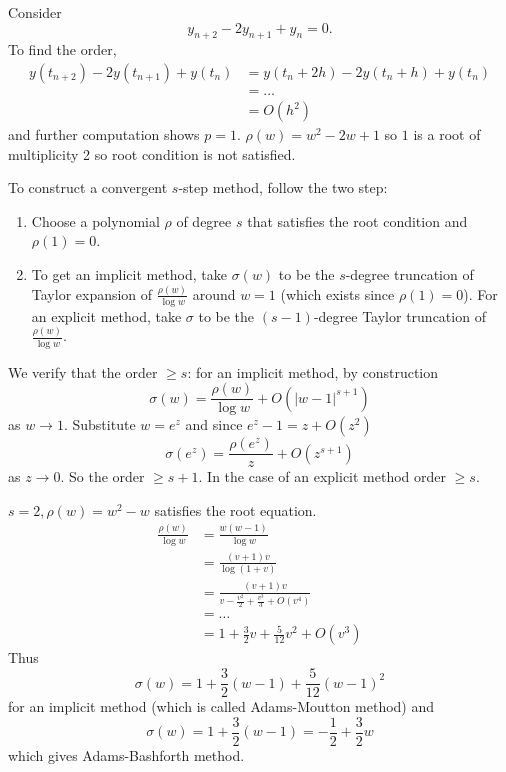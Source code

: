 \documentclass[a4paper]{article}
\begin{document}
\begin{eg}
  Consider
  \[
    y_{n + 2} - 2y_{n + 1} + y_n = 0.
  \]
  To find the order,
  \begin{align*}
    y(t_{n + 2}) - 2y(t_{n + 1}) + y(t_n)
    &= y(t_n + 2h) - 2y(t_n + h) + y(t_n) \\
    &= \dots \\
    &= O(h^2)
  \end{align*}
  and further computation shows \(p = 1\). \(\rho(w) = w^2 - 2w + 1\) so \(1\) is a root of multiplicity 2 so root condition is not satisfied.
\end{eg}

To construct a convergent \(s\)-step method, follow the two step:
\begin{enumerate}
\item Choose a polynomial \(\rho\) of degree \(s\) that satisfies the root condition and \(\rho(1) = 0\).
\item To get an implicit method, take \(\sigma(w)\) to be the \(s\)-degree truncation of Taylor expansion of \(\frac{\rho(w)}{\log w}\) around \(w = 1\) (which exists since \(\rho(1) = 0\)). For an explicit method, take \(\sigma\) to be the \((s - 1)\)-degree Taylor truncation of \(\frac{\rho(w)}{\log w}\).
\end{enumerate}

We verify that the order \(\geq s\): for an implicit method, by construction
\[
  \sigma(w) = \frac{\rho(w)}{\log w} + O(|w - 1|^{s + 1})
\]
as \(w \to 1\). Substitute \(w = e^z\) and since \(e^z - 1 = z + O(z^2)\)
\[
  \sigma(e^z) = \frac{\rho(e^z)}{z} + O(z^{s + 1})
\]
as \(z \to 0\). So the order \(\geq s + 1\). In the case of an explicit method order \(\geq s\).

\begin{eg}
  \(s = 2, \rho(w) = w^2 - w\) satisfies the root equation.
  \begin{align*}
    \frac{\rho(w)}{\log w}
    &= \frac{w(w - 1)}{\log w} \\
    &= \frac{(v + 1)v}{\log (1 + v)} \\
    &= \frac{(v + 1)v}{ v - \frac{v^2}{2} + \frac{v^3}{3} + O(v^4)} \\
    &= \dots \\
    &= 1 + \frac{3}{2}v + \frac{5}{12}v^2 + O(v^3)
  \end{align*}
  Thus
  \[
    \sigma(w) = 1 + \frac{3}{2}(w - 1) + \frac{5}{12}(w - 1)^2
  \]
  for an implicit method (which is called Adams-Moutton method) and
  \[
    \sigma(w) = 1 + \frac{3}{2}(w - 1) = -\frac{1}{2} + \frac{3}{2}w
    \]
    which gives Adams-Bashforth method.
\end{eg}
\end{document}
